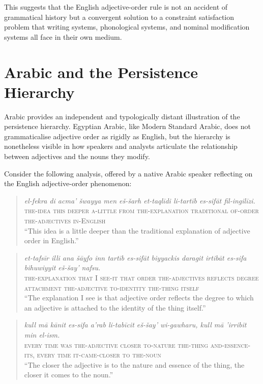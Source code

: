 \documentclass[11pt]{article}
\theoremstyle{rthm}
\theoremstyle{rdef}
\theoremstyle{remark}
\begin{document}
This suggests that the English adjective-order rule is not an accident of
grammatical history but a convergent solution to a constraint satisfaction
problem that writing systems, phonological systems, and nominal modification
systems all face in their own medium.

\section{Arabic and the Persistence Hierarchy}
\label{sec:arabic}

Arabic provides an independent and typologically distant illustration of the
persistence hierarchy. Egyptian Arabic, like Modern Standard Arabic, does not
grammaticalise adjective order as rigidly as English, but the hierarchy is
nonetheless visible in how speakers and analysts articulate the relationship
between adjectives and the nouns they modify.

Consider the following analysis, offered by a native Arabic speaker reflecting
on the English adjective-order phenomenon:

\medskip
\begin{quote}
\textit{el-fekra di acma' \v{s}wayya men e\v{s}-\v{s}arh et-taql\={i}di li-tart\={i}b es-sif\={a}t
fil-ingil\={i}zi.}\\
\smallskip
\textsc{the-idea this deeper a-little from the-explanation traditional
of-order the-adjectives in-English}\\
\smallskip
``This idea is a little deeper than the traditional explanation of adjective
order in English.''
\end{quote}

\begin{quote}
\textit{et-tafs\={i}r illi ana \v{s}\={a}yfo inn tart\={i}b es-sif\={a}t biyyackis daragit
irtib\={a}t es-sifa bihuwiyyit e\v{s}-\v{s}ay' nafsu.}\\
\smallskip
\textsc{the-explanation that I see-it that order the-adjectives reflects
degree attachment the-adjective to-identity the-thing itself}\\
\smallskip
``The explanation I see is that adjective order reflects the degree to which
an adjective is attached to the identity of the thing itself.''
\end{quote}

\begin{quote}
\textit{kull m\={a} k\={a}nit es-sifa a'rab li-tab\={i}cit e\v{s}-\v{s}ay' wi-gawharu, kull m\={a}
'irribit min el-ism.}\\
\smallskip
\textsc{every time was the-adjective closer to-nature the-thing
and-essence-its, every time it-came-closer to the-noun}\\
\smallskip
``The closer the adjective is to the nature and essence of the thing, the
closer it comes to the noun.''
\end{quote}
\end{document}
